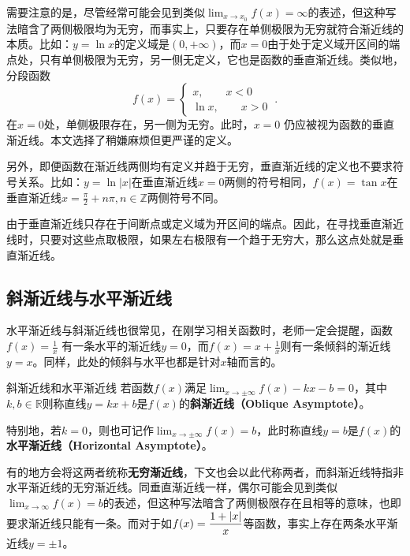 需要注意的是，尽管经常可能会见到类似$\displaystyle \lim_{x\to x_0}f(x)=\infty$的表述，但这种写法暗含了两侧极限均为无穷，而事实上，只要存在单侧极限为无穷就符合渐近线的本质。比如：$y=\ln x$的定义域是$(0,+\infty)$，而$x=0$由于处于定义域开区间的端点处，只有单侧极限为无穷，另一侧无定义，它也是函数的垂直渐近线。类似地，分段函数
\begin{equation}
f(x)=\begin{cases}
x,\qquad x<0\\
\ln x,\qquad x>0
\end{cases}~.
\end{equation}
在$x=0$处，单侧极限存在，另一侧为无穷。此时，$x = 0$ 仍应被视为函数的垂直渐近线。本文选择了稍嫌麻烦但更严谨的定义。

另外，即便函数在渐近线两侧均有定义并趋于无穷，垂直渐近线的定义也不要求符号关系。比如：$y=\ln |x|$在垂直渐近线$x=0$两侧的符号相同，$f(x)=\tan x$在垂直渐近线$\displaystyle x = \frac{\pi}{2} + n\pi,n \in \mathbb{Z}$两侧符号不同。

由于垂直渐近线只存在于间断点或定义域为开区间的端点。因此，在寻找垂直渐近线时，只要对这些点取极限，如果左右极限有一个趋于无穷大，那么这点处就是垂直渐近线。

\subsection{斜渐近线与水平渐近线}

水平渐近线与斜渐近线也很常见，在刚学习相关函数时，老师一定会提醒，函数 $\displaystyle f(x) = \frac{1}{x}$ 有一条水平的渐近线$y = 0$，而$f(x) = x + \frac{1}{x}$则有一条倾斜的渐近线$y = x$。同样，此处的倾斜与水平也都是针对$x$轴而言的。

\begin{definition}{斜渐近线和水平渐近线}
若函数$f(x)$满足$\displaystyle \lim_{x\to \pm\infty}f(x)-kx-b=0$，其中$k,b\in\mathbb{R}$则称直线$y=kx+b$是$f(x)$的\textbf{斜渐近线（Oblique Asymptote）}。

特别地，若$k=0$，则也可记作$\displaystyle \lim_{x\to \pm\infty}f(x)=b$，此时称直线$y=b$是$f(x)$的\textbf{水平渐近线（Horizontal Asymptote）}。
\end{definition}

有的地方会将这两者统称\textbf{无穷渐近线}，下文也会以此代称两者，而斜渐近线特指非水平渐近线的无穷渐近线。同垂直渐近线一样，偶尔可能会见到类似$\displaystyle \lim_{x\to \infty}f(x)=b$的表述，但这种写法暗含了两侧极限存在且相等的意味，也即要求渐近线只能有一条。而对于如$\displaystyle f(x)={1+|x|\over x}$等函数，事实上存在两条水平渐近线$y=\pm1$。

